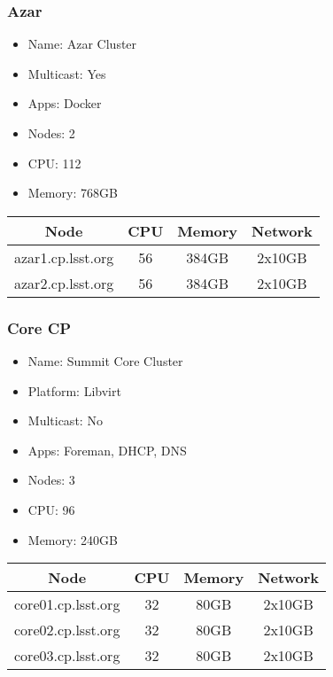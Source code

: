 \subsubsection{Azar}
\begin{itemize}
  \itemsep0em 
  \item Name:      Azar Cluster
  \item Multicast: Yes
  \item Apps:      Docker
  \item Nodes:     2
  \item CPU:       112
  \item Memory:    768GB
\end{itemize}
\begin{center}
  \small
  \begin{tabular}{||c c c c||}
    \hline
    Node & CPU & Memory & Network \\ [0.5ex]
    \hline
    azar1.cp.lsst.org & 56 & 384GB & 2x10GB \\
    \hline
    azar2.cp.lsst.org & 56 & 384GB & 2x10GB \\
    \hline
  \end{tabular}
\end{center}

\newpage
\subsubsection{Core CP}
\begin{itemize}
  \itemsep0em 
  \item Name:      Summit Core Cluster
  \item Platform:  Libvirt
  \item Multicast: No
  \item Apps:      Foreman, DHCP, DNS
  \item Nodes:     3
  \item CPU:       96
  \item Memory:    240GB
\end{itemize}
\begin{center}
  \small
  \begin{tabular}{||c c c c||}
    \hline
    Node & CPU & Memory & Network \\ [0.5ex]
    \hline
    core01.cp.lsst.org & 32 & 80GB & 2x10GB \\
    \hline
    core02.cp.lsst.org & 32 & 80GB & 2x10GB \\
    \hline
    core03.cp.lsst.org & 32 & 80GB & 2x10GB \\
    \hline
  \end{tabular}
\end{center}

